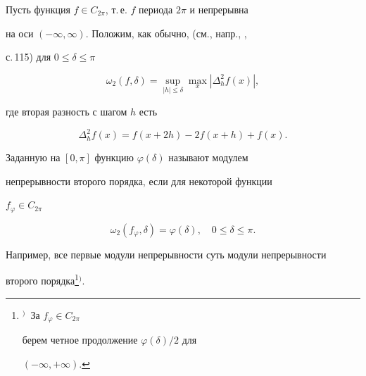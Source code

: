 

 


\pagestyle{plain} %


 


 




 


\maketitle 


\label{begin} 


 


Пусть функция $f\in C_{2\pi}$, т.\,е. $f$ периода $2\pi$ и непрерывна 


на оси $(-\infty,\infty)$. Положим, как обычно, (см., напр., \cite{1}, 


с.\,115) для $0\le\delta\le\pi$ 


$$ 


\omega_2(f,\delta)=\sup_{|h|\le\delta}\max_x 


|\Delta^2_h f(x)|, 


$$ 


где вторая разность с шагом $h$ есть 


$$ 


\Delta^2_h f(x)=f(x+2h)-2f(x+h)+f(x). 


$$ 


 


Заданную на $[0,\pi]$ функцию $\varphi(\delta)$ называют модулем 


непрерывности второго порядка, если для некоторой функции 


$f_\varphi\in C_{2\pi}$ 


$$ 


\omega_2(f_\varphi,\delta)=\varphi(\delta),\quad 


0\le\delta\le\pi. 


$$ 


Например, все первые модули непрерывности суть модули непрерывности 


второго порядка\footnote{$^)$\, За $f_\varphi\in C_{2\pi}$ 


берем четное продолжение $\varphi(\delta)/2$ для 


$(-\infty,+\infty)$.}{$^)$}. 


